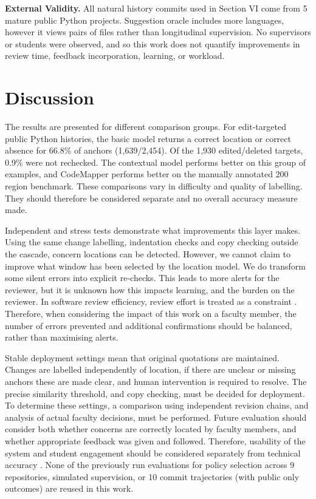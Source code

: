 \documentclass[10pt,conference,letterpaper]{IEEEtran}
\begin{document}
\textbf{External Validity.} All natural history commits used in Section VI come from 5 mature public Python projects. Suggestion oracle includes more languages, however it views pairs of files rather than longitudinal supervision. No supervisors or students were observed, and so this work does not quantify improvements in review time, feedback incorporation, learning, or workload.

\section{Discussion}
The results are presented for different comparison groups. For edit-targeted public Python histories, the basic model returns a correct location or correct absence for 66.8\% of anchors (1,639/2,454). Of the 1,930 edited/deleted targets, 0.9\% were not rechecked. The contextual model performs better on this group of examples, and CodeMapper performs better on the manually annotated 200 region benchmark. These comparisons vary in difficulty and quality of labelling. They should therefore be considered separate and no overall accuracy measure made.

Independent and stress tests demonstrate what improvements this layer makes. Using the same change labelling, indentation checks and copy checking outside the cascade, concern locations can be detected. However, we cannot claim to improve what window has been selected by the location model. We do transform some silent errors into explicit re-checks. This leads to more alerts for the reviewer, but it is unknown how this impacts learning, and the burden on the reviewer. In software review efficiency, review effort is treated as a constraint \cite{kudrjavets2024}. Therefore, when considering the impact of this work on a faculty member, the number of errors prevented and additional confirmations should be balanced, rather than maximising alerts.

Stable deployment settings mean that original quotations are maintained. Changes are labelled independently of location, if there are unclear or missing anchors these are made clear, and human intervention is required to resolve. The precise similarity threshold, and copy checking, must be decided for deployment. To determine these settings, a comparison using independent revision chains, and analysis of actual faculty decisions, must be performed. Future evaluation should consider both whether concerns are correctly located by faculty members, and whether appropriate feedback was given and followed. Therefore, usability of the system and student engagement should be considered separately from technical accuracy \cite{little2024,carlessyoung2025,weidlich2025}. None of the previously run evaluations for policy selection across 9 repositories, simulated supervision, or 10 commit trajectories (with public only outcomes) are reused in this work.
\end{document}
